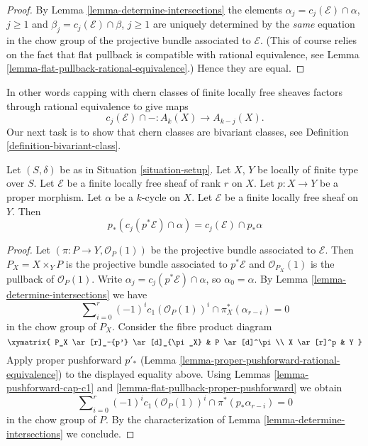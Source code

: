 \begin{proof}
By Lemma \ref{lemma-determine-intersections} the elements
$\alpha_j = c_j(\mathcal{E}) \cap \alpha$, $j \geq 1$ and
$\beta_j = c_j(\mathcal{E}) \cap \beta$, $j \geq 1$ are uniquely determined
by the {\it same} equation in the chow group of the projective
bundle associated to $\mathcal{E}$. (This of course relies on the fact that
flat pullback is compatible with rational equivalence, see
Lemma \ref{lemma-flat-pullback-rational-equivalence}.) Hence they are equal.
\end{proof}

\noindent
In other words capping with chern classes of
finite locally free sheaves factors through rational equivalence
to give maps
$$
c_j(\mathcal{E}) \cap - : A_k(X) \to A_{k - j}(X).
$$
Our next task is to show that chern classes are bivariant classes, see
Definition \ref{definition-bivariant-class}.

\begin{lemma}
\label{lemma-pushforward-cap-cj}
Let $(S, \delta)$ be as in Situation \ref{situation-setup}.
Let $X$, $Y$ be locally of finite type over $S$.
Let $\mathcal{E}$ be a finite locally free sheaf of rank $r$ on $X$.
Let $p : X \to Y$ be a proper morphism.
Let $\alpha$ be a $k$-cycle on $X$.
Let $\mathcal{E}$ be a finite locally free sheaf on $Y$.
Then
$$
p_*(c_j(p^*\mathcal{E}) \cap \alpha) = c_j(\mathcal{E}) \cap p_*\alpha
$$
\end{lemma}

\begin{proof}
Let $(\pi : P \to Y, \mathcal{O}_P(1))$ be the projective bundle associated
to $\mathcal{E}$. Then $P_X = X \times_Y P$ is the projective bundle associated
to $p^*\mathcal{E}$ and $\mathcal{O}_{P_X}(1)$ is the pullback of
$\mathcal{O}_P(1)$. Write $\alpha_j = c_j(p^*\mathcal{E}) \cap \alpha$, so
$\alpha_0 = \alpha$. By Lemma \ref{lemma-determine-intersections} we have
$$
\sum\nolimits_{i = 0}^r
(-1)^i c_1(\mathcal{O}_P(1))^i \cap
\pi_X^*(\alpha_{r - i}) = 0
$$
in the chow group of $P_X$. Consider the fibre product diagram
$$
\xymatrix{
P_X \ar[r]_-{p'} \ar[d]_{\pi_X} & P \ar[d]^\pi \\
X \ar[r]^p & Y
}
$$
Apply proper pushforward $p'_*$
(Lemma \ref{lemma-proper-pushforward-rational-equivalence})
to the displayed equality above. Using
Lemmas \ref{lemma-pushforward-cap-c1} and
\ref{lemma-flat-pullback-proper-pushforward} we obtain
$$
\sum\nolimits_{i = 0}^r
(-1)^i c_1(\mathcal{O}_P(1))^i \cap
\pi^*(p_*\alpha_{r - i}) = 0
$$
in the chow group of $P$. By the characterization of
Lemma \ref{lemma-determine-intersections} we conclude.
\end{proof}

